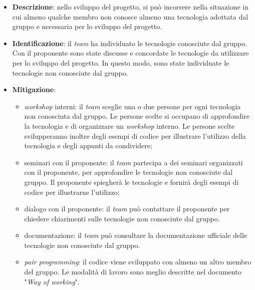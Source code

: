 \label{risk:conoscenza-tecnologie-carente}
\begin{itemize}
	\item \textbf{Descrizione}:
	      nello sviluppo del progetto, si può incorrere nella situazione in cui
	      almeno qualche membro non conosce almeno una tecnologia adottata dal
	      gruppo e necessaria per lo sviluppo del progetto.

	\item \textbf{Identificazione}: il \textit{team} ha individuato le
	      tecnologie conosciute dal gruppo. Con il proponente sono state
	      discusse e concordate le tecnologie da utilizzare per lo sviluppo del
	      progetto. In questo modo, sono state individuate le tecnologie
	      non conosciute dal gruppo.

	\item \textbf{Mitigazione}:
	      \begin{itemize}
		      \item \textit{workshop} interni: il \textit{team} sceglie
		            una o due persone per ogni tecnologia non conosciuta dal
		            gruppo. Le persone scelte si occupano di approfondire la
		            tecnologia e di organizzare un \textit{workshop} interno.
		            Le persone scelte svilupperanno inoltre degli esempi di
		            codice per illustrare l'utilizzo della tecnologia e degli
		            appunti da condividere;

		      \item seminari con il proponente: il \textit{team} partecipa a
		            dei seminari organizzati con il proponente, per approfondire
		            le tecnologie non conosciute dal gruppo. Il proponente
		            spiegherà le tecnologie e fornirà degli esempi di codice
		            per illustrarne l'utilizzo;

		      \item dialogo con il proponente: il \textit{team} può
		            contattare il proponente per chiedere chiarimenti sulle
		            tecnologie non conosciute dal gruppo.

		      \item documentazione: il \textit{team} può consultare la
		            documentazione ufficiale delle tecnologie non conosciute
		            dal gruppo.

		      \item \textit{pair programming}: il codice viene sviluppato con
		            almeno un altro membro del gruppo. Le modalità di lavoro
		            sono meglio descritte nel documento "\textit{Way of
			            working}".


\end{itemize}
\end{itemize}
